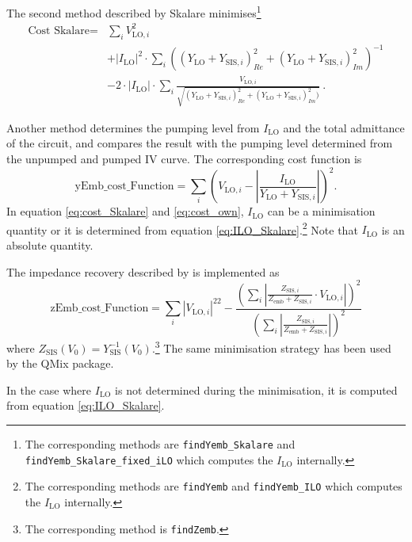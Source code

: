 \documentclass[]{article}
\begin{document}
The second method described by Skalare minimises\footnote{The corresponding methods are \texttt{findYemb\_Skalare} and \texttt{findYemb\_Skalare\_fixed\_iLO} which computes the $I_\text{LO}$ internally.}
\begin{equation}\label{eq:cost_Skalare}
\begin{split}
\text{Cost Skalare} =& \sum_i V_{\text{LO},i}^2\\ &+\left|I_\text{LO}\right|^2\cdot\sum_i \left( (Y_{\text{LO}}+Y_{\text{SIS},i})_{Re}^2+(Y_{\text{LO}}+Y_{\text{SIS},i})_{Im}^2\right)^{-1}\\& -2\cdot\left|I_\text{LO}\right|\cdot\sum_i 
\frac{V_{\text{LO},i}}{\sqrt{ (Y_{\text{LO}}+Y_{\text{SIS},i})_{Re}^2+(Y_{\text{LO}}+Y_{\text{SIS},i})_{Im}^2) }}~.
\end{split}
\end{equation}

Another method determines the pumping level from $I_\text{LO}$ and the total admittance of the circuit, and compares the result with the pumping level determined from the unpumped and pumped IV curve. The corresponding cost function is
\begin{equation}\label{eq:cost_own}
\text{yEmb\_cost\_Function} = \sum_i \left(V_{\text{LO},i} - \left|\frac{I_\text{LO}}{Y_\text{LO}+Y_{\text{SIS},i}} \right|\right)^2.
\end{equation}
In equation \ref{eq:cost_Skalare} and \ref{eq:cost_own}, $I_\text{LO}$ can be a minimisation quantity or it is determined from equation \ref{eq:ILO_Skalare}.\footnote{The corresponding methods are \texttt{findYemb} and \texttt{findYemb\_ILO} which computes the $I_\text{LO}$ internally.} Note that $I_\text{LO}$ is an absolute quantity.


The impedance recovery described by \cite{Withington1995} is implemented as 
\begin{equation}\label{eq:cost_Withington}
\text{zEmb\_cost\_Function} = \sum_i \left|V_{\text{LO},i}\right|^22 - 
\frac{\left(\sum_i \left|
	\frac{Z_{\text{SIS},i}}{Z_\text{emb}+Z_{\text{SIS},i}}\cdot V_{\text{LO},i}\right|\right)^2}
{\left(\sum_i \left|
	\frac{Z_{\text{SIS},i}}{Z_\text{emb}+Z_{\text{SIS},i}}\right|\right)^2}
\end{equation}
where $Z_{\text{SIS}}(V_0)=Y_\text{SIS}^{-1}(V_0)$.\footnote{The corresponding method is \texttt{findZemb}.} The same minimisation strategy has been used by the QMix package.


In the case where $I_\text{LO}$ is not determined during the minimisation, it is computed from equation \ref{eq:ILO_Skalare}.
\end{document}

